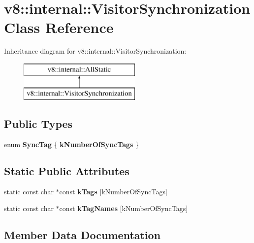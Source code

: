 \hypertarget{classv8_1_1internal_1_1_visitor_synchronization}{}\section{v8\+:\+:internal\+:\+:Visitor\+Synchronization Class Reference}
\label{classv8_1_1internal_1_1_visitor_synchronization}
Inheritance diagram for v8\+:\+:internal\+:\+:Visitor\+Synchronization\+:\begin{figure}[H]
\begin{center}
\leavevmode
\includegraphics[height=2.000000cm]{classv8_1_1internal_1_1_visitor_synchronization}
\end{center}
\end{figure}
\subsection*{Public Types}
\begin{DoxyCompactItemize}
\item 
\hypertarget{classv8_1_1internal_1_1_visitor_synchronization_a0971ddb5cd5a8da91d074f648187da7a}{}enum {\bfseries Sync\+Tag} \{ {\bfseries k\+Number\+Of\+Sync\+Tags}
 \}\label{classv8_1_1internal_1_1_visitor_synchronization_a0971ddb5cd5a8da91d074f648187da7a}

\end{DoxyCompactItemize}
\subsection*{Static Public Attributes}
\begin{DoxyCompactItemize}
\item 
static const char $\ast$const {\bfseries k\+Tags} \mbox{[}k\+Number\+Of\+Sync\+Tags\mbox{]}
\item 
static const char $\ast$const {\bfseries k\+Tag\+Names} \mbox{[}k\+Number\+Of\+Sync\+Tags\mbox{]}
\end{DoxyCompactItemize}


\subsection{Member Data Documentation}
\hypertarget{classv8_1_1internal_1_1_visitor_synchronization_a3869a214fa04d932977fabc5391add87}{}
